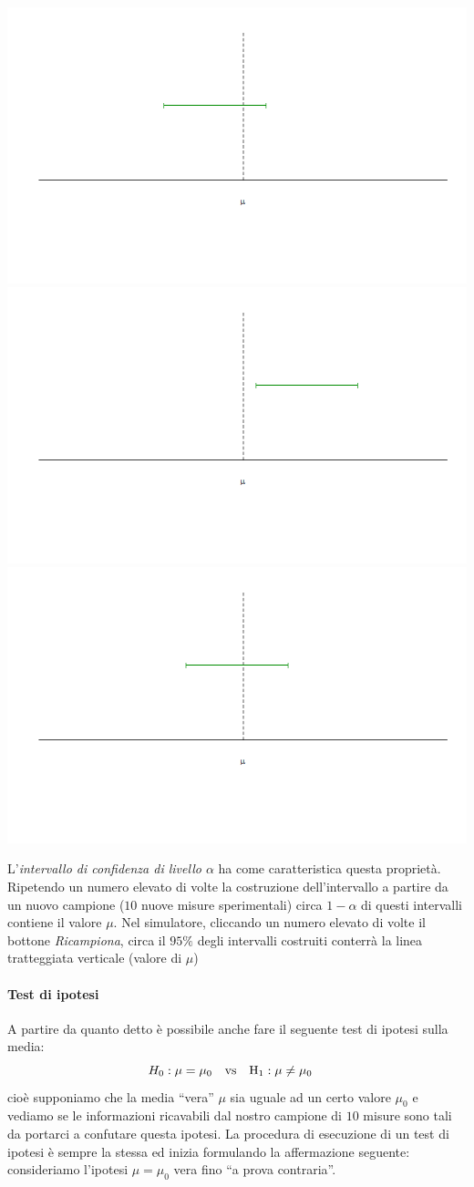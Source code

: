 \documentclass[
  11pt,
]{book}
\begin{document}
\includegraphics[width=0.35\linewidth]{Immagini/Inferenziale/intconf1}
\includegraphics[width=0.35\linewidth]{Immagini/Inferenziale/intconf2}
\includegraphics[width=0.35\linewidth]{Immagini/Inferenziale/intconf3}

L'\emph{intervallo di confidenza di livello \(\alpha\)} ha come caratteristica questa proprietà. Ripetendo un numero elevato di volte la costruzione dell'intervallo a partire da un nuovo campione (\(10\) nuove misure sperimentali) circa \(1-\alpha\) di questi intervalli contiene il valore \(\mu\).
Nel simulatore, cliccando un numero elevato di volte il bottone \emph{Ricampiona}, circa il \(95\%\) degli intervalli costruiti conterrà la linea tratteggiata verticale (valore di \(\mu\))

\hypertarget{test-di-ipotesi}{%
\paragraph{Test di ipotesi}\label{test-di-ipotesi}}

A partire da quanto detto è possibile anche fare il seguente test di ipotesi sulla media:
\[
 H_0: \mu=\mu_0 \quad \rm{vs} \quad H_1: \mu \neq \mu_0 \quad 
\]
cioè supponiamo che la media ``vera'' \(\mu\) sia uguale ad un certo valore \(\mu_0\) e vediamo se le informazioni ricavabili dal nostro campione di \(10\) misure sono tali da portarci a confutare questa ipotesi.
La procedura di esecuzione di un test di ipotesi è sempre la stessa ed inizia formulando la affermazione seguente: consideriamo l'ipotesi \(\mu=\mu_0\) vera fino ``a prova contraria''.
\end{document}
